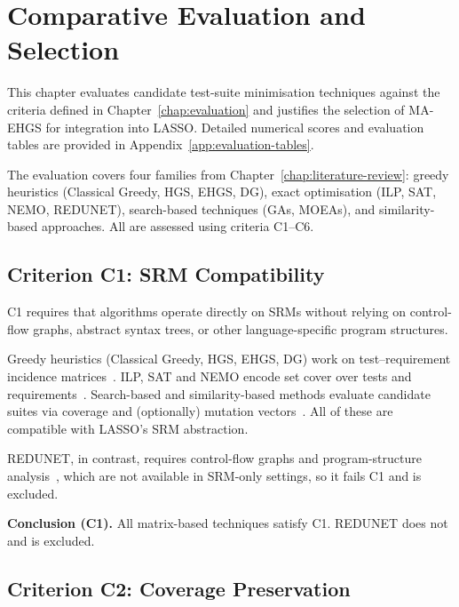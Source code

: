 \chapter{Comparative Evaluation and Selection}
\label{chap:comparison}

This chapter evaluates candidate test-suite minimisation techniques against the criteria defined in Chapter~\ref{chap:evaluation} and justifies the selection of MA-EHGS for integration into LASSO. Detailed numerical scores and evaluation tables are provided in Appendix~\ref{app:evaluation-tables}.

The evaluation covers four families from Chapter~\ref{chap:literature-review}: greedy heuristics (Classical Greedy, HGS, EHGS, DG), exact optimisation (ILP, SAT, NEMO, REDUNET), search-based techniques (GAs, MOEAs), and similarity-based approaches. All are assessed using criteria C1--C6.

\section{Criterion C1: SRM Compatibility}

C1 requires that algorithms operate directly on SRMs without relying on control-flow graphs, abstract syntax trees, or other language-specific program structures.

Greedy heuristics (Classical Greedy, HGS, EHGS, DG) work on test--requirement incidence matrices~\cite{harrold1993,chen2005,yoo2012,noemmer2020}. ILP, SAT and NEMO encode set cover over tests and requirements~\cite{rothermel1998,yoo2012,elbaum2002,lin2018}. Search-based and similarity-based methods evaluate candidate suites via coverage and (optionally) mutation vectors~\cite{yoo2012,khan2020,wei2017,bach2017}. All of these are compatible with LASSO’s SRM abstraction.

REDUNET, in contrast, requires control-flow graphs and program-structure analysis~\cite{mongiovi2020}, which are not available in SRM-only settings, so it fails C1 and is excluded.

\textbf{Conclusion (C1).} All matrix-based techniques satisfy C1. REDUNET does not and is excluded.

\section{Criterion C2: Coverage Preservation}

